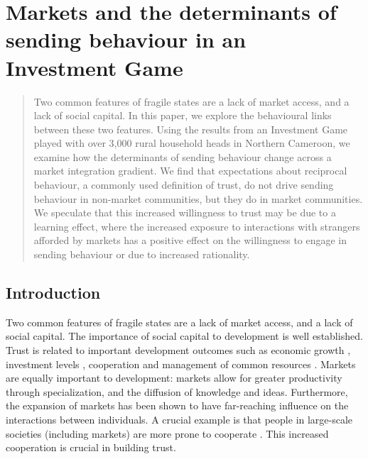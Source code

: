 \chapter{Markets and the determinants of sending behaviour in an Investment Game}
\label{chap:cameroontrust}

\renewcommand{\thetable}{\arabic{chapter}.\arabic{table}}


\begin{abstract}
Two common features of fragile states are a lack of market access, and a lack of social capital. In this paper, we explore the behavioural links between these two features. Using the results from an Investment Game played with over 3,000 rural household heads in Northern Cameroon, we examine how the determinants of sending behaviour change across a market integration gradient. We find that expectations about reciprocal behaviour, a commonly used definition of trust, do not drive sending behaviour in non-market communities, but they do in market communities. We speculate that this increased willingness to trust may be due to a learning effect, where the increased exposure to interactions with strangers afforded by markets has a positive effect on the willingness to engage in sending behaviour or due to increased rationality.
\end{abstract}


\section{Introduction}

Two common features of fragile states are a lack of market access, and a lack of social capital. The importance of social capital to development is well established. Trust is related to important development outcomes such as economic growth \citep{Knack1997}, investment levels \citep{Zak2001}, cooperation \citep{Gachter2004,Sonderskov2011} and management of common resources \citep{Bouma2008}. Markets are equally important to development: markets allow for greater productivity through specialization, and the diffusion of knowledge and ideas. Furthermore, the expansion of markets has been shown to have far-reaching influence on the interactions between individuals. A crucial example is that people in large-scale societies (including markets) are more prone to cooperate \citep{Henrich2010}. This increased cooperation is crucial in building trust.

